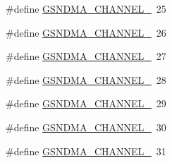 \begin{DoxyCompactItemize}
\#define \hyperlink{a00484_a3750b075005d49e145662b326d46e114}{GSNDMA\_\-CHANNEL\_}~25
\item 
\#define \hyperlink{a00484_aa54c6bfd2061c30275f0e9e55a0fd602}{GSNDMA\_\-CHANNEL\_}~26
\item 
\#define \hyperlink{a00484_a8707844494eee5b22880dd4c6a89b4c2}{GSNDMA\_\-CHANNEL\_}~27
\item 
\#define \hyperlink{a00484_a76ba60151657aa3b6780b3739640590f}{GSNDMA\_\-CHANNEL\_}~28
\item 
\#define \hyperlink{a00484_ab28322a6b190c0b4ba882a2aaf1b9a28}{GSNDMA\_\-CHANNEL\_}~29
\item 
\#define \hyperlink{a00484_aa8aa2ddbe72b70f74bcffe9368b7d872}{GSNDMA\_\-CHANNEL\_}~30
\item 
\#define \hyperlink{a00484_abb1e8fb25e50fad258a291a11bd80d37}{GSNDMA\_\-CHANNEL\_}~31
\end{DoxyCompactItemize}
